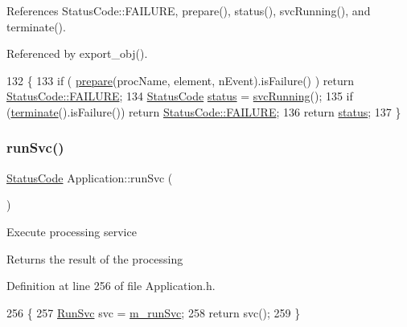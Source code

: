 References Status\+Code\+::\+F\+A\+I\+L\+U\+RE, prepare(), status(), svc\+Running(), and terminate().



Referenced by export\+\_\+obj().


\begin{DoxyCode}
132                                            \{
133   \textcolor{keywordflow}{if} ( \hyperlink{classApplication_a61dcc20b7f4b7c19b697db7516a62afa}{prepare}(procName, element, nEvent).isFailure() ) \textcolor{keywordflow}{return} 
      \hyperlink{classStatusCode_a6f565cbeadc76d14c72f047e5e85eb4ba3da73d4c469762eb9d3c960368252b26}{StatusCode::FAILURE};
134   \hyperlink{classStatusCode}{StatusCode} \hyperlink{classApplication_ad429c4d2322f706e3564c1ee05d38ff1}{status} = \hyperlink{classApplication_a35eca6b5e618b508a0736d032e2a9203}{svcRunning}();
135   \textcolor{keywordflow}{if} (\hyperlink{classApplication_a1a36a06d48d94a9a8fdc29a77d2cb9f0}{terminate}().isFailure()) \textcolor{keywordflow}{return} \hyperlink{classStatusCode_a6f565cbeadc76d14c72f047e5e85eb4ba3da73d4c469762eb9d3c960368252b26}{StatusCode::FAILURE};
136   \textcolor{keywordflow}{return} \hyperlink{classApplication_ad429c4d2322f706e3564c1ee05d38ff1}{status};
137 \}
\end{DoxyCode}
\mbox{\label{classApplication_abfbf40397efe6ff0627d2ce1a55381ce}} 
\subsubsection{\texorpdfstring{run\+Svc()}{runSvc()}}
{\footnotesize\ttfamily \hyperlink{classStatusCode}{Status\+Code} Application\+::run\+Svc (\begin{DoxyParamCaption}{ }\end{DoxyParamCaption})\hspace{0.3cm}{\ttfamily [inline]}}

Execute processing service \begin{DoxyReturn}{Returns}
the result of the processing 
\end{DoxyReturn}


Definition at line 256 of file Application.\+h.


\begin{DoxyCode}
256                        \{
257     \hyperlink{Application_8h_a59643f52f9391fa83f137814aaae27ef}{RunSvc} svc = \hyperlink{classApplication_ad2c061af424280151c86b9b56d9724d3}{m\_runSvc};
258     \textcolor{keywordflow}{return} svc();
259   \}
\end{DoxyCode}
\mbox{\label{classApplication_a1712ebe326b3d1855b839c59f52633d8}} 
